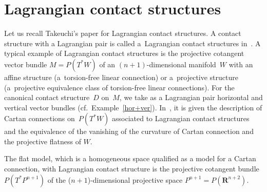 \section{Lagrangian contact structures}
\label{Lagrangian contact structures.}

Let us recall Takeuchi's paper \cite{Tak} for Lagrangian contact structures.
A contact structure with a Lagrangian pair is called a~Lagrangian contact structures in~\cite{Tak}.
A typical example of Lagrangian contact structures
is the projective cotangent vector bundle
$M = P(T^*W)$ of an $(n+1)$-dimensional manifold~$W$
with an af\/f\/ine structure (a~torsion-free linear connection) or
a~projective structure
(a~projective equivalence class of torsion-free linear connections).
For the canonical contact structure~$D$ on~$M$,
we take as a Lagrangian pair horizontal and vertical vector bundles
(cf.\ Example~\ref{hor+ver}).
In~\cite{Tak}, it is given the description of Cartan connections on~$P(T^*W)$
associated to Lagrangian contact structures and the equivalence of the vanishing
of the curvature of Cartan connection and the projective f\/latness of $W$.

The f\/lat model, which is a homogeneous space qualif\/ied as a model
for a Cartan connection, with Lagrangian contact structure is
the projective cotangent bundle $P(T^*P^{n+1})$
of the ($n+1$)-dimensional projective space $P^{n+1}=P(\mathbf{R}^{n+2})$.

